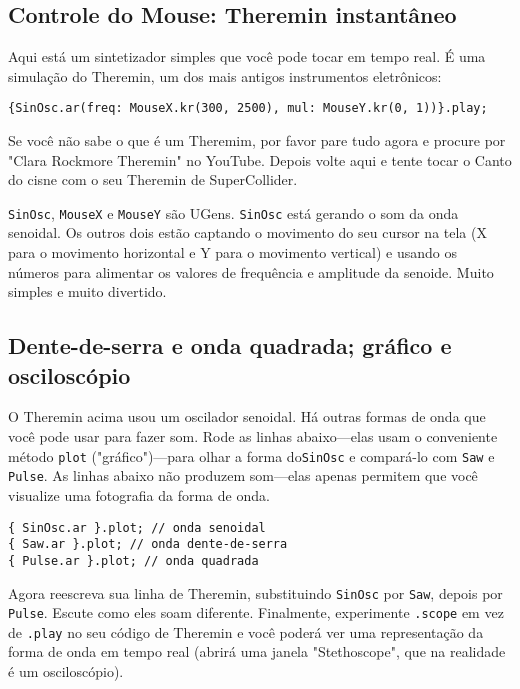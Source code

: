\subsection{Controle do Mouse: Theremin instantâneo}

Aqui está um sintetizador simples que você pode tocar em tempo real. É uma simulação do Theremin, um dos mais antigos instrumentos eletrônicos:

\begin{lstlisting}[style=SuperCollider-IDE, basicstyle=\scttfamily\footnotesize]
{SinOsc.ar(freq: MouseX.kr(300, 2500), mul: MouseY.kr(0, 1))}.play;
\end{lstlisting}

Se você não sabe o que é um Theremim, por favor pare tudo agora e procure por "Clara Rockmore Theremin" no YouTube. Depois volte aqui e tente tocar o Canto do cisne com o seu Theremin de SuperCollider.

\texttt{SinOsc}, \texttt{MouseX} e \texttt{MouseY} são UGens. \texttt{SinOsc} está gerando o som da onda senoidal. Os outros dois estão captando o movimento do seu cursor na tela (X para o movimento horizontal e Y para o movimento vertical) e usando os números para alimentar os valores de frequência e amplitude da senoide. Muito simples e muito divertido.

\subsection{Dente-de-serra e onda quadrada; gráfico e osciloscópio}

O Theremin acima usou um oscilador senoidal. Há outras formas de onda que você pode usar para fazer som. Rode as linhas abaixo---elas usam o conveniente método \texttt{plot} ("gráfico")---para olhar a forma do\texttt{SinOsc} e compará-lo com \texttt{Saw} e \texttt{Pulse}. As linhas abaixo não produzem som---elas apenas permitem que você visualize uma fotografia da forma de onda.

\begin{lstlisting}[style=SuperCollider-IDE, basicstyle=\scttfamily\footnotesize]
{ SinOsc.ar }.plot; // onda senoidal
{ Saw.ar }.plot; // onda dente-de-serra
{ Pulse.ar }.plot; // onda quadrada
\end{lstlisting}

Agora reescreva sua linha de Theremin, substituindo \texttt{SinOsc} por \texttt{Saw}, depois por \texttt{Pulse}. Escute como eles soam diferente. Finalmente, experimente \texttt{.scope} em vez de \texttt{.play} no seu código de Theremin e você poderá ver uma representação da forma de onda em tempo real (abrirá uma janela "Stethoscope", que na realidade é um osciloscópio).
